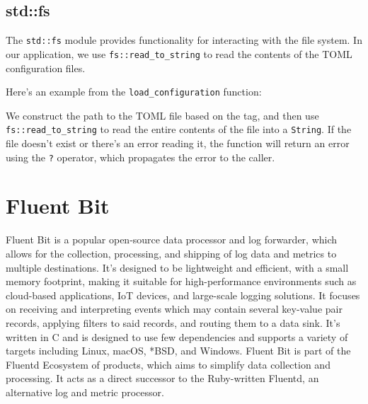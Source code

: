 \subsection{std::fs}
The \texttt{std::fs} module provides functionality for interacting with the file system. In our application, we use \texttt{fs::read\_to\_string} to read the contents of the TOML configuration files.

Here's an example from the \texttt{load\_configuration} function:



We construct the path to the TOML file based on the tag, and then use \texttt{fs::read\_to\_string} to read the entire contents of the file into a \texttt{String}. If the file doesn't exist or there's an error reading it, the function will return an error using the \texttt{?} operator, which propagates the error to the caller.

\section{Fluent Bit}
Fluent Bit is a popular open-source data processor and log forwarder, which allows for the collection, processing, and shipping of log data and metrics to multiple destinations. It's designed to be lightweight and efficient, with a small memory footprint, making it suitable for high-performance environments such as cloud-based applications, IoT devices, and large-scale logging solutions. It focuses on receiving and interpreting events which may contain several key-value pair records, applying filters to said records, and routing them to a data sink. It's written in C and is designed to use few dependencies and supports a variety of targets including Linux, macOS, *BSD, and Windows. Fluent Bit is part of the Fluentd Ecosystem of products, which aims to simplify data collection and processing. It acts as a direct successor to the Ruby-written Fluentd, an alternative log and metric processor.

